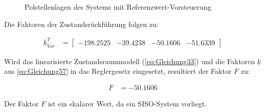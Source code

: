 \begin{figure}[H]
    \centering
    \caption[Polstellenlage Vorsteuerung]{Polstellenlagen des Systems mit Referenzwert-Vorsteuerung}
    \label{fig:Bild10}
\end{figure}

 Die Faktoren der Zustandsrückführung folgen zu:
 
 \begin{align} \label{eq:Gleichung57}
     \underline{k}^T_{Vor} &= 
     \begin{bmatrix}
        -198.2525 & -39.4238 & -50.1606 & -51.6339
     \end{bmatrix}
 \end{align}
 
Wird das linearisierte Zustandsraummodell (\autoref{eq:Gleichung33}) und die Faktoren $\underline{k}$ aus \autoref{eq:Gleichung57} in das Reglergesetz eingesetzt, resultiert der Faktor $F$ zu:

\begin{align}\label{eq:Gleichung58}
    F &= -50.1606
\end{align}

Der Faktor $F$ ist ein skalarer Wert, da ein SISO-System vorliegt.


